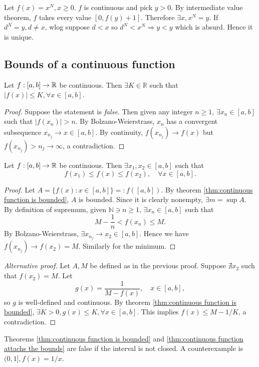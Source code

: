 \begin{example}
    Let $ f(x)=x^N, x\ge 0 $. $f$ is continuous and pick $y>0$. By intermediate value theorem, $f$ takes every value $ [0,f(y)+1] $. Therefore $ \exists x, x^N=y $. If $ d^N=y,d\neq x $, wlog suppose $d<x$ so $ d^N<x^N \Rightarrow y<y $ which is absurd. Hence it is unique. 
\end{example}

\subsection{Bounds of a continuous function}
\begin{theorem}\label{thm:continuous function is bounded}
    Let $f:[a,b]\to {\mathbb{R}}$ be continuous. Then $ \exists K\in \mathbb{R}  $ such that $ |f(x)|\le K, \forall x\in [a,b] $.
\end{theorem}
\begin{proof}
    Suppose the statement is \textit{false}. Then given any integer $ n\ge 1 $, $ \exists x_n\in[a,b] $ such that $ |f(x_n)|> n $. By Bolzano-Weierstrass, $x_n$ has a convergent subsequence $ x_{n_j}\to x\in [a,b] $. By continuity, $ f(x_{n_j})\to f(x) $ but $f(x_{n_j})>n_j\to \infty$, a contradiction.
\end{proof}

\begin{theorem}\label{thm:continuous function attachs the bounds}
    Let $ f:[a,b]\to {\mathbb{R}} $ be continuous. Then $ \exists x_1,x_2\in [a,b] $ such that 
    \[
        f(x_1)\le f(x)\le f(x_2),\quad \forall x\in [a,b].
    \]
\end{theorem}
\begin{proof}
    Let $ A = \{f(x):x\in [a,b]\}=: f([a,b]) $. By theorem \ref{thm:continuous function is bounded}, $A$ is bounded. Since it is clearly nonempty, $ \exists m = \sup A $. By definition of supremum, given $ \mathbb{N} \ni n\ge 1$, $ \exists x_n\in [a,b] $ such that 
    \[
        M-\frac{1}{n}<f(x_n)\le M.
    \]
    By Bolzano-Weierstrass, $ \exists x_{n_j}\to x_2\in [a,b] $. Hence we have $ f(x_{n_j})\to f(x_2) = M $. Similarly for the minimum.
\end{proof}

\begin{proof}[Alternative proof]
    Let $A,M$ be defined as in the previous proof. Suppose $\nexists x_2$ such that $ f(x_2)=M $. Let 
    \[
        g(x) = \frac{1}{M-f(x)},\quad x\in [a,b],
    \]
    so $g$ is well-defined and continuous. By theorem \ref{thm:continuous function is bounded}, $ \exists K>0, g(x)\le K,\forall x\in [a,b] $. This implies $ f(x)\le M-1/K $, a contradiction.
\end{proof}
\begin{note}
    Theorems \ref{thm:continuous function is bounded} and \ref{thm:continuous function attachs the bounds} are false if the interval is not closed. A counterexample is $ (0,1], f(x)=1/x $.
\end{note}


